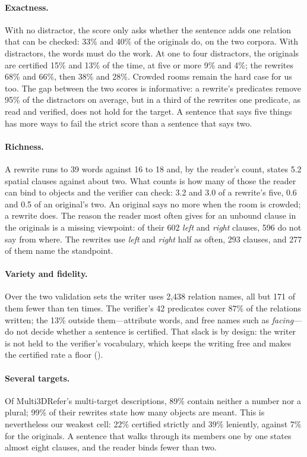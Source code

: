 \paragraph{Exactness.}
With no distractor, the score only asks whether the sentence adds one relation that can be checked: 33\% and 40\% of the originals do, on the two corpora.
With distractors, the words must do the work.
At one to four distractors, the originals are certified 15\% and 13\% of the time, at five or more 9\% and 4\%; the rewrites 68\% and 66\%, then 38\% and 28\%.
Crowded rooms remain the hard case for us too.
The gap between the two scores is informative: a rewrite's predicates remove 95\% of the distractors on average, but in a third of the rewrites one predicate, as read and verified, does not hold for the target.
A sentence that says five things has more ways to fail the strict score than a sentence that says two.

\paragraph{Richness.}
A rewrite runs to 39 words against 16 to 18 and, by the reader's count, states 5.2 spatial clauses against about two.
What counts is how many of those the reader can bind to objects and the verifier can check: 3.2 and 3.0 of a rewrite's five, 0.6 and 0.5 of an original's two.
An original says no more when the room is crowded; a rewrite does.
The reason the reader most often gives for an unbound clause in the originals is a missing viewpoint: of their 602 \emph{left} and \emph{right} clauses, 596 do not say from where.
The rewrites use \emph{left} and \emph{right} half as often, 293 clauses, and 277 of them name the standpoint.

\paragraph{Variety and fidelity.}
Over the two validation sets the writer uses 2,438 relation names, all but 171 of them fewer than ten times.
The verifier's 42 predicates cover 87\% of the relations written; the 13\% outside them---attribute words, and free names such as \emph{facing}---do not decide whether a sentence is certified.
That slack is by design: the writer is not held to the verifier's vocabulary, which keeps the writing free and makes the certified rate a floor ().

\paragraph{Several targets.}
Of Multi3DRefer's multi-target descriptions, 89\% contain neither a number nor a plural; 99\% of their rewrites state how many objects are meant.
This is nevertheless our weakest cell: 22\% certified strictly and 39\% leniently, against 7\% for the originals.
A sentence that walks through its members one by one states almost eight clauses, and the reader binds fewer than two.

